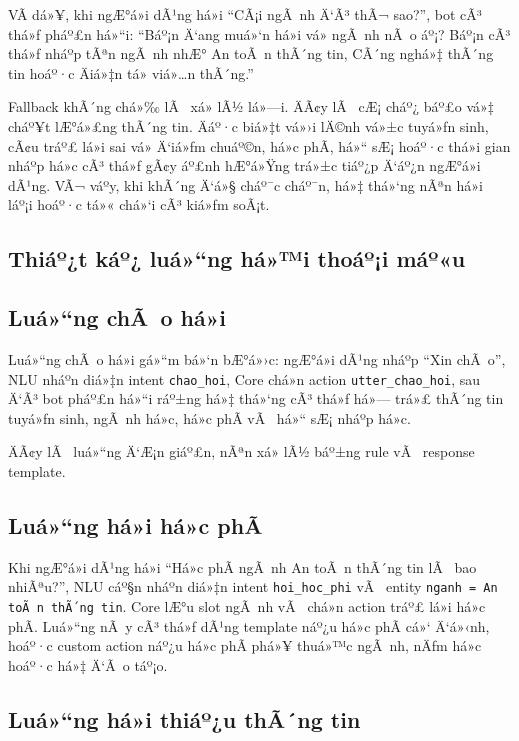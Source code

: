 ﻿\documentclass[12pt,a4paper]{report}
\begin{document}
VÃ­ dá»¥, khi ngÆ°á»i dÃ¹ng há»i ``CÃ¡i ngÃ nh Ä‘Ã³ thÃ¬ sao?'', bot cÃ³ thá»ƒ pháº£n há»“i: ``Báº¡n Ä‘ang muá»‘n há»i vá» ngÃ nh nÃ o áº¡? Báº¡n cÃ³ thá»ƒ nháº­p tÃªn ngÃ nh nhÆ° An toÃ n thÃ´ng tin, CÃ´ng nghá»‡ thÃ´ng tin hoáº·c Äiá»‡n tá»­ viá»…n thÃ´ng.''

Fallback khÃ´ng chá»‰ lÃ  xá»­ lÃ½ lá»—i. ÄÃ¢y lÃ  cÆ¡ cháº¿ báº£o vá»‡ cháº¥t lÆ°á»£ng thÃ´ng tin. Äáº·c biá»‡t vá»›i lÄ©nh vá»±c tuyá»ƒn sinh, cÃ¢u tráº£ lá»i sai vá» Ä‘iá»ƒm chuáº©n, há»c phÃ­, há»“ sÆ¡ hoáº·c thá»i gian nháº­p há»c cÃ³ thá»ƒ gÃ¢y áº£nh hÆ°á»Ÿng trá»±c tiáº¿p Ä‘áº¿n ngÆ°á»i dÃ¹ng. VÃ¬ váº­y, khi khÃ´ng Ä‘á»§ cháº¯c cháº¯n, há»‡ thá»‘ng nÃªn há»i láº¡i hoáº·c tá»« chá»‘i cÃ³ kiá»ƒm soÃ¡t.

\subsection*{Thiáº¿t káº¿ luá»“ng há»™i thoáº¡i máº«u}

\subsection*{Luá»“ng chÃ o há»i}

Luá»“ng chÃ o há»i gá»“m bá»‘n bÆ°á»›c: ngÆ°á»i dÃ¹ng nháº­p ``Xin chÃ o'', NLU nháº­n diá»‡n intent \texttt{chao\_hoi}, Core chá»n action \texttt{utter\_chao\_hoi}, sau Ä‘Ã³ bot pháº£n há»“i ráº±ng há»‡ thá»‘ng cÃ³ thá»ƒ há»— trá»£ thÃ´ng tin tuyá»ƒn sinh, ngÃ nh há»c, há»c phÃ­ vÃ  há»“ sÆ¡ nháº­p há»c.

ÄÃ¢y lÃ  luá»“ng Ä‘Æ¡n giáº£n, nÃªn xá»­ lÃ½ báº±ng rule vÃ  response template.

\subsection*{Luá»“ng há»i há»c phÃ­}

Khi ngÆ°á»i dÃ¹ng há»i ``Há»c phÃ­ ngÃ nh An toÃ n thÃ´ng tin lÃ  bao nhiÃªu?'', NLU cáº§n nháº­n diá»‡n intent \texttt{hoi\_hoc\_phi} vÃ  entity \texttt{nganh = An toÃ n thÃ´ng tin}. Core lÆ°u slot ngÃ nh vÃ  chá»n action tráº£ lá»i há»c phÃ­. Luá»“ng nÃ y cÃ³ thá»ƒ dÃ¹ng template náº¿u há»c phÃ­ cá»‘ Ä‘á»‹nh, hoáº·c custom action náº¿u há»c phÃ­ phá»¥ thuá»™c ngÃ nh, nÄƒm há»c hoáº·c há»‡ Ä‘Ã o táº¡o.

\subsection*{Luá»“ng há»i thiáº¿u thÃ´ng tin}
\end{document}
